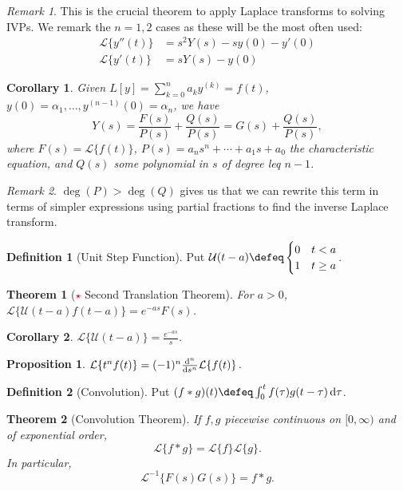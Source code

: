 \documentclass[12pt, oneside]{article}
\newcommand{\laplace}[1]{\mathcal{L}\{#1\}}
\newcommand{\ilaplace}[1]{\mathcal{L}^{-1}\{#1\}}
\newcommand{\unit}[1]{\mathcal{U}(#1)}
\theoremstyle{definition}
\newtheorem{defn}{Definition}
\theoremstyle{plain}
\newtheorem{thm}{Theorem}
\newtheorem{cor}{Corollary}
\newtheorem{prop}{Proposition}
\theoremstyle{remark}
\newtheorem{remark}{Remark}
\begin{document}
\begin{remark}
This is the crucial theorem to apply Laplace transforms to solving IVPs. We remark the $n = 1, 2$ cases as these will be the most often used:
\begin{align*}
  \laplace{y''(t)} &= s^2 Y(s) - sy(0) - y'(0)\\
  \laplace{y'(t)} &= sY(s) - y(0)
\end{align*}
\end{remark}
\begin{cor}
  Given $L[y] = \sum_{k=0}^n a_k y^{(k)} = f(t)$, $y(0) = \alpha_1, \dots, y^{(n-1)}(0) = \alpha_n$, we have \[
  Y(s) = \frac{F(s)}{P(s)}  + \frac{Q(s)}{P(s)} = G(s) + \frac{Q(s)}{P(s)},
  \]
  where $F(s) = \laplace{f(t)}$, $P(s) = a_ns^n + \cdots + a_1 s + a_0$ the characteristic equation, and $Q(s)$ some polynomial in $s$ of degree leq $n - 1$.
\end{cor}

\begin{remark}
  $\deg(P) > \deg(Q)$ gives us that we can rewrite this term in terms of simpler expressions using partial fractions to find the inverse Laplace transform.
\end{remark}

\begin{defn}[Unit Step Function]
  Put $\unit{t - a} \defeq \begin{cases}
    0 & t < a\\
    1 & t \geq a
  \end{cases}$.
\end{defn}
\begin{thm}[\textcolor{red}{$\star$} Second Translation Theorem]
For $a > 0$, $\laplace{\unit{t - a} f(t - a)} = e^{-as} F(s)$.
\end{thm}
\begin{cor}
  $\laplace{\unit{t - a}} = \frac{e^{-as}}{s}$.
\end{cor}

\begin{prop}
  $\laplace{t^n f(t)} = (-1)^n \dv[n]{s} \laplace{f(t)}$.
\end{prop}

\begin{defn}[Convolution]
  Put $(f \ast g)(t) \defeq \int_0^t f(\tau) g(t - \tau) \dd{\tau}$.
\end{defn}

\begin{thm}[Convolution Theorem]
  If $f, g$ piecewise continuous on $[0, \infty)$ and of exponential order, \[
  \laplace{f \ast g} = \laplace{f}\laplace{g}.  
  \]
  In particular, \[
  \ilaplace{F(s)G(s)} = f \ast g.  
  \]
\end{thm}
\end{document}
